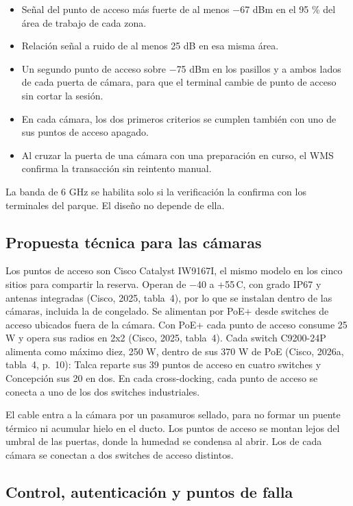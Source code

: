 \begin{itemize}
  \item Señal del punto de acceso más fuerte de al menos $-$67 dBm en el 95 \% del área de trabajo de cada zona.
  \item Relación señal a ruido de al menos 25 dB en esa misma área.
  \item Un segundo punto de acceso sobre $-$75 dBm en los pasillos y a ambos lados de cada puerta de cámara, para que el terminal cambie de punto de acceso sin cortar la sesión.
  \item En cada cámara, los dos primeros criterios se cumplen también con uno de sus puntos de acceso apagado.
  \item Al cruzar la puerta de una cámara con una preparación en curso, el WMS confirma la transacción sin reintento manual.
\end{itemize}

La banda de 6 GHz se habilita solo si la verificación la confirma con los terminales del parque. El diseño no depende de ella.

\subsection*{Propuesta técnica para las cámaras}

Los puntos de acceso son Cisco Catalyst IW9167I, el mismo modelo en los cinco sitios para compartir la reserva. Operan de $-$40 a +55\,\textdegree{}C, con grado IP67 y antenas integradas (Cisco, 2025, tabla~4), por lo que se instalan dentro de las cámaras, incluida la de congelado. Se alimentan por PoE+ desde switches de acceso ubicados fuera de la cámara. Con PoE+ cada punto de acceso consume 25 W y opera sus radios en 2x2 (Cisco, 2025, tabla~4). Cada switch C9200-24P alimenta como máximo diez, 250 W, dentro de sus 370 W de PoE (Cisco, 2026a, tabla~4, p.~10): Talca reparte sus 39 puntos de acceso en cuatro switches y Concepción sus 20 en dos. En cada cross-docking, cada punto de acceso se conecta a uno de los dos switches industriales.

El cable entra a la cámara por un pasamuros sellado, para no formar un puente térmico ni acumular hielo en el ducto. Los puntos de acceso se montan lejos del umbral de las puertas, donde la humedad se condensa al abrir. Los de cada cámara se conectan a dos switches de acceso distintos.

\subsection*{Control, autenticación y puntos de falla}

